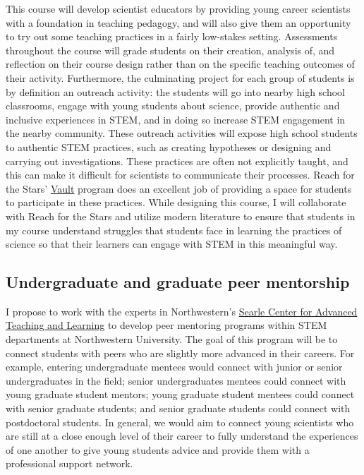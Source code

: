 \documentclass[aasms,11pt]{article}
\begin{document}
This course will develop scientist educators by providing young career scientists with a foundation in teaching pedagogy, and will also give them an opportunity to try out some teaching practices in a fairly low-stakes setting.
Assessments throughout the course will grade students on their creation, analysis of, and reflection on their course design rather than on the specific teaching outcomes of their activity.
Furthermore, the culminating project for each group of students is by definition an outreach activity: the students will go into nearby high school classrooms, engage with young students about science, provide authentic and inclusive experiences in STEM, and in doing so increase STEM engagement in the nearby community.
These outreach activities will expose high school students to authentic STEM practices, such as creating hypotheses or designing and carrying out investigations.
These practices are often not explicitly taught, and this can make it difficult for scientists to communicate their processes.
Reach for the Stars' \href{https://avault.github.io/}{Vault} program does an excellent job of providing a space for students to participate in these practices.
While designing this course, I will collaborate with Reach for the Stars and utilize modern literature \citep[e.g.,][]{dasgupta&all2014} to ensure that students in my course understand struggles that students face in learning the practices of science so that their learners can engage with STEM in this meaningful way.

\subsection{Undergraduate and graduate peer mentorship}
\label{sct:mentoring}
I propose to work with the experts in Northwestern's \href{https://www.northwestern.edu/searle/index.html}{Searle Center for Advanced Teaching and Learning} to develop peer mentoring programs within STEM departments at Northwestern University.
The goal of this program will be to connect students with peers who are slightly more advanced in their careers.
For example, entering undergraduate mentees would connect with junior or senior undergraduates in the field; senior undergraduates mentees could connect with young graduate student mentors; young graduate student mentees could connect with senior graduate students; and senior graduate students could connect with postdoctoral students.
In general, we would aim to connect young scientists who are still at a close enough level of their career to fully understand the experiences of one another to give young students advice and provide them with a professional support network.
\end{document}
